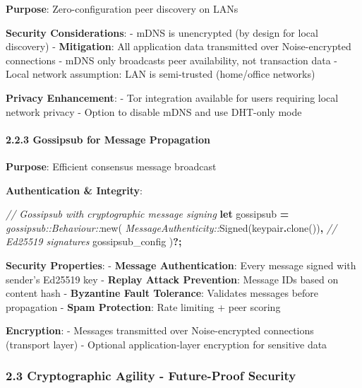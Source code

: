 \documentclass[
  11pt,
]{article}
\newenvironment{Shaded}{\begin{snugshade}}{\end{snugshade}}
\newcommand{\CommentTok}[1]{\textcolor[rgb]{0.56,0.35,0.01}{\textit{#1}}}
\newcommand{\KeywordTok}[1]{\textcolor[rgb]{0.13,0.29,0.53}{\textbf{#1}}}
\newcommand{\NormalTok}[1]{#1}
\newcommand{\OperatorTok}[1]{\textcolor[rgb]{0.81,0.36,0.00}{\textbf{#1}}}
\newcommand{\PreprocessorTok}[1]{\textcolor[rgb]{0.56,0.35,0.01}{\textit{#1}}}
\begin{document}
\textbf{Purpose}: Zero-configuration peer discovery on LANs

\textbf{Security Considerations}: - mDNS is unencrypted (by design for
local discovery) - \textbf{Mitigation}: All application data transmitted
over Noise-encrypted connections - mDNS only broadcasts peer
availability, not transaction data - Local network assumption: LAN is
semi-trusted (home/office networks)

\textbf{Privacy Enhancement}: - Tor integration available for users
requiring local network privacy - Option to disable mDNS and use
DHT-only mode

\hypertarget{gossipsub-for-message-propagation}{%
\paragraph{2.2.3 Gossipsub for Message
Propagation}\label{gossipsub-for-message-propagation}}

\textbf{Purpose}: Efficient consensus message broadcast

\textbf{Authentication \& Integrity}:

\begin{Shaded}
\begin{Highlighting}[]
\CommentTok{// Gossipsub with cryptographic message signing}
\KeywordTok{let}\NormalTok{ gossipsub }\OperatorTok{=} \PreprocessorTok{gossipsub::Behaviour::}\NormalTok{new(}
    \PreprocessorTok{MessageAuthenticity::}\NormalTok{Signed(keypair}\OperatorTok{.}\NormalTok{clone())}\OperatorTok{,}  \CommentTok{// Ed25519 signatures}
\NormalTok{    gossipsub\_config}
\NormalTok{)}\OperatorTok{?;}
\end{Highlighting}
\end{Shaded}

\textbf{Security Properties}: - \textbf{Message Authentication}: Every
message signed with sender's Ed25519 key - \textbf{Replay Attack
Prevention}: Message IDs based on content hash - \textbf{Byzantine Fault
Tolerance}: Validates messages before propagation - \textbf{Spam
Protection}: Rate limiting + peer scoring

\textbf{Encryption}: - Messages transmitted over Noise-encrypted
connections (transport layer) - Optional application-layer encryption
for sensitive data

\hypertarget{cryptographic-agility---future-proof-security}{%
\subsubsection{2.3 Cryptographic Agility - Future-Proof
Security}\label{cryptographic-agility---future-proof-security}}
\end{document}
